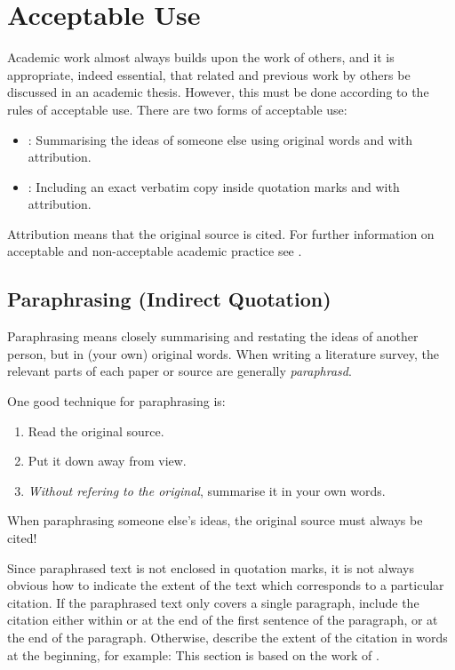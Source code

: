 \section{Acceptable Use}

Academic work almost always builds upon the work of others, and it is
appropriate, indeed essential, that related and previous work by
others be discussed in an academic thesis. However, this must be done
according to the rules of acceptable use. There are two forms of
acceptable use:
\begin{itemize}
\item {}: Summarising the ideas
  of someone else using original words and with attribution.
\item {}: Including an exact
  verbatim copy inside quotation marks and with attribution.
\end{itemize}
Attribution means that the original source is cited.
For further information on acceptable and non-acceptable academic
practice see \citep{FremdeFedern,Wikipedia-Zitat}.




\subsection{Paraphrasing (Indirect Quotation)}

Paraphrasing means closely summarising and restating the ideas of
another person, but in (your own) original words. When writing a
literature survey, the relevant parts of each paper or source are
generally \emph{paraphrasd}.

One good technique for paraphrasing is:
\begin{enumerate}
\item Read the original source.
\item Put it down away from view.
\item \emph{Without refering to the original}, summarise it in your own words.
\end{enumerate}
When paraphrasing someone else's ideas, the original source must
always be cited!

Since paraphrased text is not enclosed in quotation marks, it is not
always obvious how to indicate the extent of the text which
corresponds to a particular citation. If the paraphrased text only
covers a single paragraph, include the citation either within or at
the end of the first sentence of the paragraph, or at the end of the
paragraph. Otherwise, describe the extent of the citation in words at
the beginning, for example: This section is based on the work of
\citet{InfoSkyIVS}.




